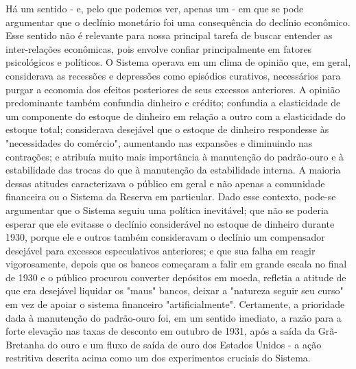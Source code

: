 \documentclass[a4paper,12pt]{article}[abntex2]
\begin{document}
Há um sentido - e, pelo que podemos ver, apenas um - em que se pode argumentar que o declínio monetário foi uma consequência do declínio econômico. Esse sentido não é relevante para nossa principal tarefa de buscar entender as inter-relações econômicas, pois envolve confiar principalmente em fatores psicológicos e políticos. O Sistema operava em um clima de opinião que, em geral, considerava as recessões e depressões como episódios curativos, necessários para purgar a economia dos efeitos posteriores de seus excessos anteriores. A opinião predominante também confundia dinheiro e crédito; confundia a elasticidade de um componente do estoque de dinheiro em relação a outro com a elasticidade do estoque total; considerava desejável que o estoque de dinheiro respondesse às "necessidades do comércio", aumentando nas expansões e diminuindo nas contrações; e atribuía muito mais importância à manutenção do padrão-ouro e à estabilidade das trocas do que à manutenção da estabilidade interna. A maioria dessas atitudes caracterizava o público em geral e não apenas a comunidade financeira ou o Sistema da Reserva em particular. Dado esse contexto, pode-se argumentar que o Sistema seguiu uma política inevitável; que não se poderia esperar que ele evitasse o declínio considerável no estoque de dinheiro durante 1930, porque ele e outros também consideravam o declínio um compensador desejável para excessos especulativos anteriores; e que sua falha em reagir vigorosamente, depois que os bancos começaram a falir em grande escala no final de 1930 e o público procurou converter depósitos em moeda, refletia a atitude de que era desejável liquidar os "maus" bancos, deixar a "natureza seguir seu curso" em vez de apoiar o sistema financeiro "artificialmente". Certamente, a prioridade dada à manutenção do padrão-ouro foi, em um sentido imediato, a razão para a forte elevação nas taxas de desconto em outubro de 1931, após a saída da Grã-Bretanha do ouro e um fluxo de saída de ouro dos Estados Unidos - a ação restritiva descrita acima como um dos experimentos cruciais do Sistema.
\end{document}
